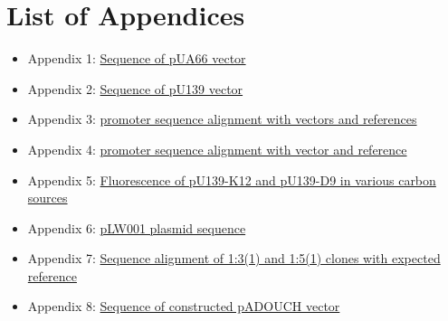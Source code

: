\chapter*{List of Appendices}

\begin{itemize}[label={}]
\item Appendix 1: \hypertarget{pUA66seq}{\href{https://drive.google.com/open?id=1oHOr45i53oj1ZvaJO2rwhhKW336-1qDa}{Sequence of pUA66 vector}}
\item Appendix 2: \hypertarget{p139seq}{\href{https://drive.google.com/open?id=1eTZO0u8nTtbIphnsHlNvB4G_L2-LnJ-f}{Sequence of pU139 vector}}
\item Appendix 3: \hypertarget{placZalign}{\href{https://drive.google.com/open?id=1uxseqbHVccpsxmKUuVl5_nBY2wEvpF8J}{ promoter sequence alignment with vectors and references}}
\item Appendix 4: \hypertarget{precAalign}{\href{https://drive.google.com/open?id=1g5AUZ4vEhNVGWuKy9A7augQ2beI5EW9o}{ promoter sequence alignment with vector and reference}}
\item Appendix 5: \hypertarget{FCnegs}{\href{https://drive.google.com/open?id=1M2mKz7TUkuwOr1n_dIoUlk9kRn0nOF99}{Fluorescence of pU139-K12 and pU139-D9 in various carbon sources}}
\item Appendix 6: \hypertarget{pLW001}{\href{https://drive.google.com/open?id=1HhTVjaBZxkOQPb05qaPJYQk1XmyXM7zO}{pLW001 plasmid sequence}}
\item Appendix 7: \hypertarget{pADOUCHseq}{\href{https://drive.google.com/open?id=1RT7LigW9waKPSw4mTKGJVCJavP3P0kWW}{Sequence alignment of 1:3(1) and 1:5(1) clones with expected reference}}
\item Appendix 8: \hypertarget{pADOUCHwhole}{\href{https://drive.google.com/open?id=1kS7Ih-cgBlwvxuMc4spGqSF4MdvcVV9f}{Sequence of constructed pADOUCH vector}}
\end{itemize}



